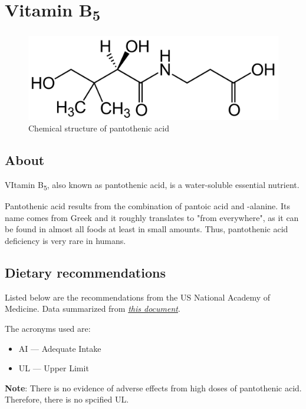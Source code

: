 \documentclass{book}
\begin{document}
\begin{sloppypar}
\chapter{Vitamin B\texorpdfstring{\textsubscript{5}}{5}}
\begin{figure}[h]
	\caption{Chemical structure of pantothenic acid}
	\centering \includegraphics[width=\textwidth]{images/Vitamin_B5_chemical_structure}
\end{figure}
\newpage

\section{About}
VItamin B\textsubscript{5}, also known as pantothenic acid, is a water-soluble essential nutrient.

Pantothenic acid results from the combination of pantoic acid and \textbeta-alanine. Its name comes from Greek and it roughly translates to "from everywhere", as it can be found in almost all foods at least in small amounts. Thus, pantothenic acid deficiency is very rare in humans.

\section{Dietary recommendations}
Listed below are the recommendations from the US National Academy of Medicine. Data summarized from \href{https://nap.nationalacademies.org/read/6015/chapter/12}{\textit{this document}}.

The acronyms used are:
\begin{itemize}
	\item AI --- Adequate Intake
	\item UL --- Upper Limit
\end{itemize}

\textbf{Note}: There is no evidence of adverse effects from high doses of pantothenic acid. Therefore, there is no spcified UL.


\end{sloppypar}
\end{document}
